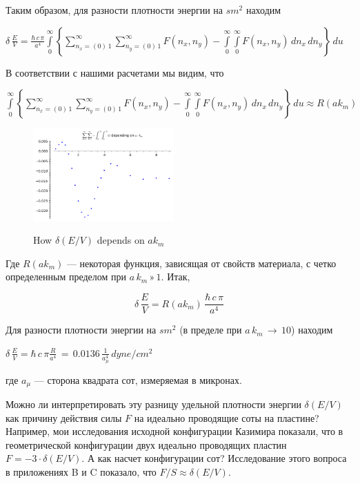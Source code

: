 \documentclass[11pt]{article}
\begin{document}
    Таким образом, для разности плотности энергии на \(sm^2\) находим

    \(\delta\,\frac{E}{V} = \frac{\hbar\,c\,\pi}{a^4} \int\limits_{0}^{\infty}{ \left\{ \sum\limits_{n_x=\left(0\right)\,1}^{\infty} \sum\limits_{n_y=\left(0\right)\,1}^{\infty} F\left(n_x, n_y\right) - \int\limits_{0}^{\infty} \int\limits_{0}^{\infty} F\left(n_x, n_y\right)\,d{n_x}\,d{n_y} \right\} }\,d{u}\)

    В соответствии с нашими расчетами мы видим, что

    \(\int\limits_{0}^{\infty}{ \left\{ \sum\limits_{n_x=\left(0\right)\,1}^{\infty} \sum\limits_{n_y=\left(0\right)\,1}^{\infty} F\left(n_x, n_y\right) - \int\limits_{0}^{\infty} \int\limits_{0}^{\infty} F\left(n_x, n_y\right)\,d{n_x}\,d{n_y} \right\} }\,d{u} \approx R\left(a k_m\right)\)

    \begin{figure}
\begin{center}
\includegraphics[width=0.48\textwidth]{sum_sum_int_int_G_on_a_km.png}
\caption{}{How $\delta\left(E/V\right)$ depends on $a k_m$}
\end{center}
\label{fig:G_on_a_km}
\end{figure}

    Где \(R\left(a k_m\right)\) --- некоторая функция, зависящая от свойств
материала, с четко определенным пределом при \(a\,k_m\,»\,1\). Итак,

    \begin{equation}
\delta\,\frac{E}{V} = R\left(a k_m\right)\,\frac{\hbar\,c\,\pi}{a^4}
\end{equation}

    Для разности плотности энергии на \(sm^2\) (в пределе при
\(a\,k_m\,\rightarrow \,10\)) находим

    \(\delta\,\frac{E}{V} = \hbar\,c\, \pi\frac{R}{a^4}\,=\,0.0136\,\frac{1}{a_{\mu}^4}\,dyne/cm^2\)

    где \(a_{\mu}\) --- сторона квадрата сот, измеряемая в микронах.

    Можно ли интерпретировать эту разницу удельной плотности энергии
\(\delta\left(E/V\right)\) как причину действия силы \(F\) на идеально
проводящие соты на пластине? Например, мои исследования исходной
конфигурации Казимира показали, что в геометрической конфигурации двух
идеально проводящих пластин \(F = -3 \cdot \delta\left(E/V\right)\). А
как насчет конфигурации сот? Исследование этого вопроса в приложениях B
и C показало, что \(F/S \approx \delta\left(E/V\right)\).
\end{document}
